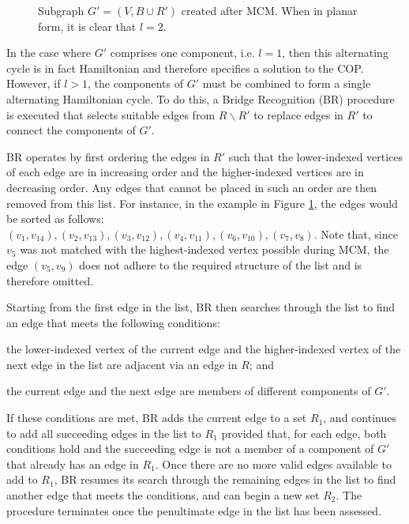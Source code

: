 \documentclass[runningheads]{llncs}
\begin{document}
\begin{figure}[H]	
	\centering
	\begin{subfigure}[h]{0.4\textwidth}
		
	\end{subfigure} \quad
	\begin{subfigure}[h]{0.56\textwidth}
		
	\end{subfigure}
	\caption{Subgraph $G'= (V, B \cup R')$ created after MCM. When in planar form, it is clear that $l = 2$.}
	\label{fig:mps}
\end{figure}

\noindent In the case where $G'$ comprises one component, i.e. $l = 1$, then this alternating cycle is in fact Hamiltonian and therefore specifies a solution to the COP. However, if $l > 1$, the components of $G'$ must be combined to form a single alternating Hamiltonian cycle. To do this, a Bridge Recognition (BR) procedure is executed that selects suitable edges from $R\backslash R'$ to replace edges in $R'$ to connect the components of $G'$.

BR operates by first ordering the edges in $R'$ such that the lower-indexed vertices of each edge are in increasing order and the higher-indexed vertices are in decreasing order. Any edges that cannot be placed in such an order are then removed from this list. For instance, in the example in Figure \ref{fig:mps}, the edges would be sorted as follows: $(v_1, v_{14}), (v_2, v_{13}),(v_3, v_{12}),(v_4, v_{11}),(v_6, v_{10}),(v_7, v_8)$. Note that, since $v_5$ was not matched with the highest-indexed vertex possible during MCM, the edge $(v_5, v_9)$ does not adhere to the required structure of the list and is therefore omitted.

Starting from the first edge in the list, BR then searches through the list to find an edge that meets the following conditions: 
\begin{enumerate*}[label={(\alph*)}]
	\item the lower-indexed vertex of the current edge and the higher-indexed vertex of the next edge in the list are adjacent via an edge in $R$; and
	\item the current edge and the next edge are members of different components of $G'$.
\end{enumerate*}
If these conditions are met, BR adds the current edge to a set $R_1$, and continues to add all succeeding edges in the list to $R_1$ provided that, for each edge, both conditions hold and the succeeding edge is not a member of a component of $G'$ that already has an edge in $R_1$. Once there are no more valid edges available to add to $R_1$, BR resumes its search through the remaining edges in the list to find another edge that meets the conditions, and can begin a new set $R_2$. The procedure terminates once the penultimate edge in the list has been assessed.
\end{document}
